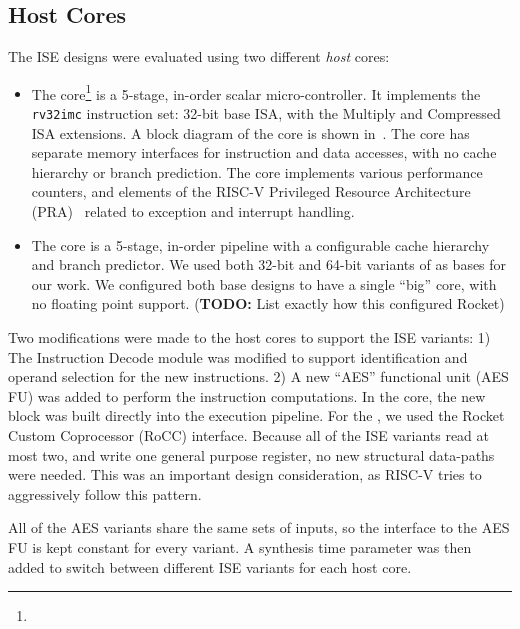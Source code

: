 
\subsection{Host Cores}

The ISE designs were evaluated using two different {\em host} cores:

\begin{itemize}
\item
    The  core\footnote{%
}   is a 5-stage, in-order scalar micro-controller.
    It implements the
    {\tt rv32imc}
    instruction set: 32-bit base ISA, with the Multiply and Compressed
    ISA extensions.
    A block diagram of the core is shown in~.
    The core has separate memory interfaces for instruction and data
    accesses, with no cache hierarchy or branch prediction.
    The core implements various performance counters,
    and
    elements of the
    RISC-V Privileged Resource Architecture 
    (PRA)~\cite[Chapter 3]{RV:ISA:II:17}
    related to exception and interrupt handling.

\item
    The  core\cite{rocket:16} 
    is a 5-stage, in-order pipeline with a configurable cache hierarchy and
    branch predictor.
    We used both 32-bit and 64-bit variants of  as bases for our work.
    We configured both base designs to have a single ``big'' core, with
    no floating point support.
    ({\bf TODO:} List exactly how this configured Rocket)

\end{itemize}

Two modifications were made to the host cores to support the ISE variants:
1) The Instruction Decode module was modified to support identification and
   operand selection for the new instructions. 
2) A new ``AES'' functional unit (AES FU) was added to perform the instruction
   computations.
In the  core, the new block was built directly into the execution
pipeline.
For the , we used the Rocket Custom Coprocessor (RoCC)
interface.
Because all of the ISE variants read at most two,
and write one general purpose register, no new structural data-paths
were needed.
This was an important design consideration, as RISC-V tries to
aggressively follow this pattern.

All of the AES variants share the same sets of inputs, so the interface
to the AES FU is kept constant for every variant.
A synthesis time parameter was then added to switch between different
ISE variants for each host core.


